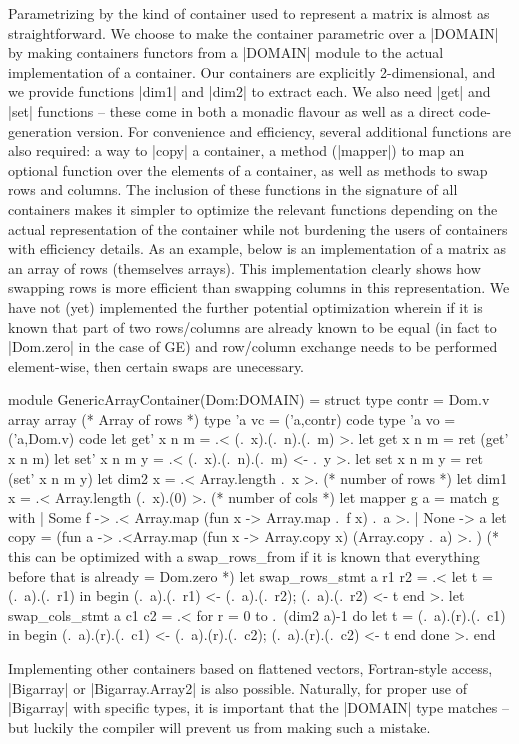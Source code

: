 \documentclass{llncs}
\begin{document}
Parametrizing by the kind of container used to represent a matrix is
almost as straightforward.  We choose to make the container parametric
over a |DOMAIN| by making containers functors from a |DOMAIN| module
to the actual implementation of a container.  Our containers are
explicitly 2-dimensional, and we provide functions |dim1| and |dim2|
to extract each.  We also need |get| and |set| functions -- these come
in both a monadic flavour as well as a direct code-generation version.
For convenience and efficiency, several additional functions are also
required: a way to |copy| a container, a method (|mapper|) to map an
optional function over the elements of a container, as well as methods
to swap rows and columns.  The inclusion of these functions in the 
signature of all containers makes it simpler to optimize the relevant
functions depending on the actual representation of the container
while not burdening the users of containers with efficiency details.
As an example, below is an implementation of a matrix as an
array of rows (themselves arrays).  This implementation clearly shows
how swapping rows is more efficient than swapping columns in this
representation.  We have not (yet) implemented the further potential
optimization wherein if it is known that part of two rows/columns are already
known to be equal (in fact to |Dom.zero| in the case of GE) and
row/column exchange needs to be performed element-wise, then certain
swaps are unecessary.

\begin{small}
\begin{code}
module GenericArrayContainer(Dom:DOMAIN) =
  struct
  type contr = Dom.v array array (* Array of rows *)
  type 'a vc = ('a,contr) code
  type 'a vo = ('a,Dom.v) code
  let get' x n m = .< (.~x).(.~n).(.~m) >.
  let get x n m = ret (get' x n m)
  let set' x n m y = .< (.~x).(.~n).(.~m) <- .~y >.
  let set x n m y = ret (set' x n m y)
  let dim2 x = .< Array.length .~x >.       (* number of rows *)
  let dim1 x = .< Array.length (.~x).(0) >. (* number of cols *)
  let mapper g a = match g with
      | Some f -> .< Array.map (fun x -> Array.map .~f x) .~a >.
      | None   -> a
  let copy = (fun a -> .<Array.map (fun x -> Array.copy x) 
                       (Array.copy .~a) >. )
  (* this can be optimized with a swap_rows_from if it is known that
     everything before that is already = Dom.zero *)
  let swap_rows_stmt a r1 r2 =
      .< let t = (.~a).(.~r1) in
         begin 
             (.~a).(.~r1) <- (.~a).(.~r2);
             (.~a).(.~r2) <- t
         end >.
  let swap_cols_stmt a c1 c2 = .< 
      for r = 0 to .~(dim2 a)-1 do
          let t = (.~a).(r).(.~c1) in
          begin 
              (.~a).(r).(.~c1) <- (.~a).(r).(.~c2);
              (.~a).(r).(.~c2) <- t
          end
      done  >.
end
\end{code}
\end{small}
\noindent  Implementing other containers based on flattened vectors,
Fortran-style access, |Bigarray| or |Bigarray.Array2| is also possible.
Naturally, for proper use of |Bigarray| with specific types, it is 
important that the |DOMAIN| type matches -- but luckily the compiler 
will prevent us from making such a mistake.
\end{document}
